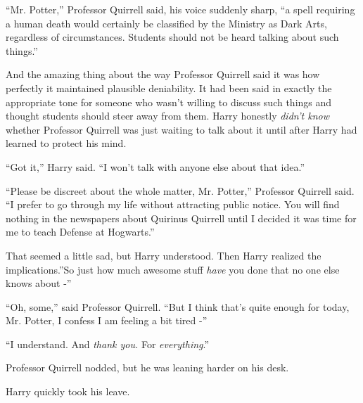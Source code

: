 ``Mr. Potter,'' Professor Quirrell said, his voice suddenly sharp, ``a
spell requiring a human death would certainly be classified by the
Ministry as Dark Arts, regardless of circumstances. Students should not
be heard talking about such things.''

And the amazing thing about the way Professor Quirrell said it was how
perfectly it maintained plausible deniability. It had been said in
exactly the appropriate tone for someone who wasn't willing to discuss
such things and thought students should steer away from them. Harry
honestly \emph{didn't know} whether Professor Quirrell was just waiting
to talk about it until after Harry had learned to protect his mind.

``Got it,'' Harry said. ``I won't talk with anyone else about that
idea.''

``Please be discreet about the whole matter, Mr. Potter,'' Professor
Quirrell said. ``I prefer to go through my life without attracting
public notice. You will find nothing in the newspapers about Quirinus
Quirrell until I decided it was time for me to teach Defense at
Hogwarts.''

That seemed a little sad, but Harry understood. Then Harry realized the
implications.''So just how much awesome stuff \emph{have} you done that
no one else knows about -''

``Oh, some,'' said Professor Quirrell. ``But I think that's quite enough
for today, Mr. Potter, I confess I am feeling a bit tired -''

``I understand. And \emph{thank you.} For \emph{everything}.''

Professor Quirrell nodded, but he was leaning harder on his desk.

Harry quickly took his leave.
